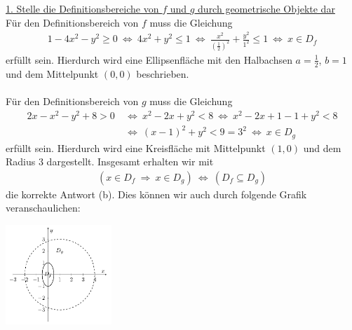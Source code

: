 \underline{1. Stelle die Definitionsbereiche von $ f $ und $ g $ durch geometrische Objekte dar}\\
Für den Definitionsbereich von $ f $ muss die Gleichung
\begin{align*}
1 - 4x^2 -y^2 \geq 0
\
\Leftrightarrow
\
4x^2 + y^2 \leq 1
\ \Leftrightarrow \
\frac{x^2}{\left(\frac{1}{2}\right)^2} + \frac{y^2}{1^2} \leq 1
\ \Leftrightarrow \
x \in D_f
\end{align*}
erfüllt sein.
Hierdurch wird eine Ellipsenfläche mit den Halbachsen $ a = \frac{1}{2}$, $ b = 1 $ und dem Mittelpunkt $ (0,0) $ beschrieben.\\ \\
Für den Definitionsbereich von $ g $ muss die Gleichung
\begin{align*}
2x - x^2 -y^2 + 8 > 0
&\ \Leftrightarrow \
x^2 - 2x + y^2 < 8
\ \Leftrightarrow \
x^2 - 2x + 1 - 1 + y^2 < 8\\
&\ \Leftrightarrow \
(x-1)^2 + y^2 < 9 =3^2
\ \Leftrightarrow \
x \in D_g
\end{align*}
erfüllt sein. Hierdurch wird eine Kreisfläche mit Mittelpunkt $ (1,0) $ und dem Radius $ 3 $ dargestellt.
Insgesamt erhalten wir mit
\begin{align*}
(x \in D_f \ \Rightarrow \ x \in D_g)  \ \Leftrightarrow \ (D_f \subseteq D_g)
\end{align*}
die korrekte Antwort (b). Dies können wir auch durch folgende Grafik veranschaulichen:
\begin{center}
	\includegraphics[width=0.3\textwidth]{pictures/auf4_4.png}
\end{center}
\newpage

